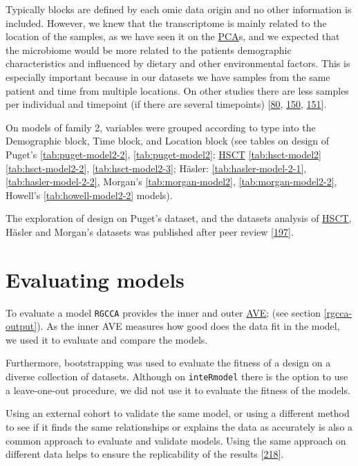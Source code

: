 \documentclass[
  12pt,
  a4paper,
  twoside,
  openright]{book}
\begin{document}
Typically blocks are defined by each omic data origin and no other information is included.
However, we knew that the transcriptome is mainly related to the location of the samples, as we have seen it on the \protect\hyperlink{acronyms_PCA}{PCA}s, and we expected that the microbiome would be more related to the patients demographic characteristics and influenced by dietary and other environmental factors.
This is especially important because in our datasets we have samples from the same patient and time from multiple locations.
On other studies there are less samples per individual and timepoint (if there are several timepoints) {[}\protect\hyperlink{ref-hasler_uncoupling_2016}{80}, \protect\hyperlink{ref-morgan2015}{150}, \protect\hyperlink{ref-howell2018}{151}{]}.

On models of family 2, variables were grouped according to type into the Demographic block, Time block, and Location block (see tables on design of Puget's \ref{tab:puget-model2-2}, \ref{tab:puget-model2}; \protect\hyperlink{acronyms_HSCT}{HSCT} \ref{tab:hsct-model2} \ref{tab:hsct-model2-2}, \ref{tab:hsct-model2-3}; Häsler: \ref{tab:hasler-model-2-1}, \ref{tab:hasler-model-2-2}, Morgan's \ref{tab:morgan-model2}, \ref{tab:morgan-model2-2}, Howell's \ref{tab:howell-model2-2} models).

The exploration of design on Puget's dataset, and the datasets analysis of \protect\hyperlink{acronyms_HSCT}{HSCT}, Häsler and Morgan's datasets was published after peer review {[}\protect\hyperlink{ref-revilla2021}{197}{]}.

\hypertarget{evaluating-models}{%
\section{Evaluating models}\label{evaluating-models}}

To evaluate a model \texttt{RGCCA} provides the inner and outer \protect\hyperlink{acronyms_AVE}{AVE}; (see section \ref{rgcca-output}).
As the inner AVE measures how good does the data fit in the model, we used it to evaluate and compare the models.

Furthermore, bootstrapping was used to evaluate the fitness of a design on a diverse collection of datasets.
Although on \texttt{inteRmodel} there is the option to use a leave-one-out procedure, we did not use it to evaluate the fitness of the models.

Using an external cohort to validate the same model, or using a different method to see if it finds the same relationships or explains the data as accurately is also a common approach to evaluate and validate models.
Using the same approach on different data helps to ensure the replicability of the results {[}\protect\hyperlink{ref-community2021}{218}{]}.
\end{document}
